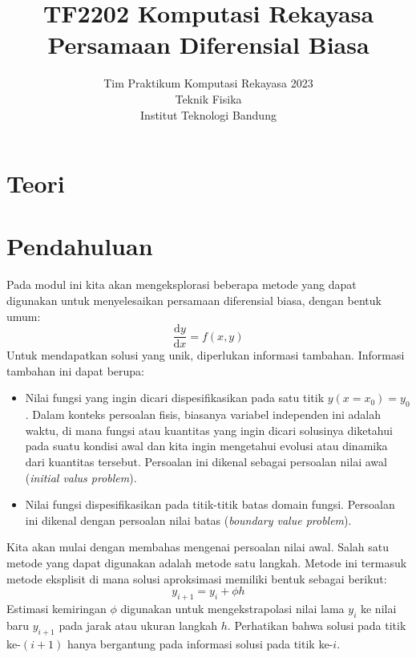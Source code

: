 



\title{%
{\small TF2202 Komputasi Rekayasa}\\
Persamaan Diferensial Biasa
}
\author{Tim Praktikum Komputasi Rekayasa 2023\\
Teknik Fisika\\
Institut Teknologi Bandung}
\date{}
\maketitle


\section*{Teori}


\section*{Pendahuluan}
Pada modul ini kita akan mengeksplorasi beberapa metode yang
dapat digunakan untuk menyelesaikan persamaan diferensial biasa, dengan bentuk umum:
\begin{equation}
\frac{\mathrm{d}y}{\mathrm{d}x} = f(x,y)
\label{eq:dydx_umum}
\end{equation}
Untuk mendapatkan solusi yang unik, diperlukan informasi tambahan.
Informasi tambahan ini dapat berupa:
\begin{itemize}
\item Nilai fungsi yang ingin dicari dispesifikasikan pada satu titik $y(x=x_0)=y_0$.
Dalam konteks persoalan fisis, biasanya variabel independen ini adalah waktu, di mana
fungsi atau kuantitas yang ingin dicari solusinya diketahui pada suatu kondisi awal
dan kita ingin mengetahui evolusi atau dinamika dari kuantitas tersebut. Persoalan
ini dikenal sebagai persoalan nilai awal (\textit{initial valus problem}).
\item Nilai fungsi dispesifikasikan pada titik-titik batas domain fungsi.
Persoalan ini dikenal dengan persoalan nilai batas (\textit{boundary value problem}).
\end{itemize}

Kita akan mulai dengan membahas mengenai persoalan nilai awal. Salah satu metode yang
dapat digunakan adalah metode satu langkah. Metode ini termasuk metode eksplisit
di mana solusi aproksimasi memiliki bentuk sebagai berikut:
\begin{equation*}
y_{i+1} = y_{i} + \phi h
\end{equation*}
Estimasi kemiringan $\phi$ digunakan untuk mengekstrapolasi nilai lama
$y_{i}$ ke nilai baru $y_{i+1}$ pada jarak atau ukuran langkah $h$.
Perhatikan bahwa solusi pada titik ke-$(i+1)$ hanya bergantung pada informasi solusi
pada titik ke-$i$.


